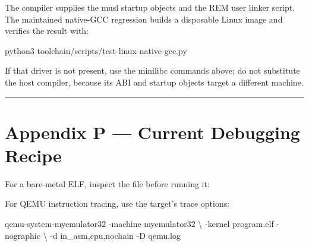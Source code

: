 \documentclass[
  oneside,
  openany]{book}
\newenvironment{Shaded}{\begin{snugshade}}{\end{snugshade}}
\newcommand{\AttributeTok}[1]{\textcolor[rgb]{0.13,0.29,0.53}{#1}}
\newcommand{\DataTypeTok}[1]{\textcolor[rgb]{0.13,0.29,0.53}{#1}}
\newcommand{\ExtensionTok}[1]{#1}
\newcommand{\NormalTok}[1]{#1}
\newcommand{\OperatorTok}[1]{\textcolor[rgb]{0.81,0.36,0.00}{\textbf{#1}}}
\newcommand{\VariableTok}[1]{\textcolor[rgb]{0.00,0.00,0.00}{#1}}
\begin{document}
The compiler supplies the musl startup objects and the REM user linker
script. The maintained native-GCC regression builds a disposable Linux
image and verifies the result with:

\begin{Shaded}
\begin{Highlighting}[]
\ExtensionTok{python3}\NormalTok{ toolchain/scripts/test{-}linux{-}native{-}gcc.py}
\end{Highlighting}
\end{Shaded}

If that driver is not present, use the minilibc commands above; do not
substitute the host compiler, because its ABI and startup objects target
a different machine.

\begin{center}\rule{0.5\linewidth}{0.5pt}\end{center}

\hypertarget{appendix-p-current-debugging-recipe}{%
\chapter{Appendix P --- Current Debugging
Recipe}\label{appendix-p-current-debugging-recipe}}

For a bare-metal ELF, inspect the file before running it:

\begin{Shaded}
\end{Shaded}

For QEMU instruction tracing, use the target's trace options:

\begin{Shaded}
\begin{Highlighting}[]
\ExtensionTok{qemu{-}system{-}myemulator32} \AttributeTok{{-}machine}\NormalTok{ myemulator32 }\DataTypeTok{\textbackslash{}}
  \AttributeTok{{-}kernel}\NormalTok{ program.elf }\AttributeTok{{-}nographic} \DataTypeTok{\textbackslash{}}
  \AttributeTok{{-}d}\NormalTok{ in\_asm,cpu,nochain }\AttributeTok{{-}D}\NormalTok{ qemu.log}
\end{Highlighting}
\end{Shaded}
\end{document}
